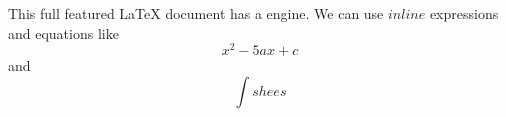 \markdownRendererUlBeginTight
\markdownRendererUlItem This full featured LaTeX document has a  engine.\markdownRendererUlItemEnd 
\markdownRendererUlItem We can use $inline$ expressions and equations like $$x^2-5ax+c$$ and $$\int shees$$\markdownRendererUlItemEnd 
\markdownRendererUlEndTight \relax